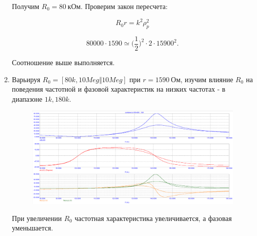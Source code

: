 \documentclass[a4paper, 12pt]{article}%
\begin{document}
\begin{enumerate}
Получим $R_0 = 80 \: \textit{кОм}$. Проверим закон пересчета:

\[R_0 r = k^2 \rho_p^2\]

\[80000 \cdot 1590 \simeq \Big(\frac{1}{2}\Big)^2 \cdot 2 \cdot 15900^2.\]

Соотношение выше выполняется.

\item Варьируя $R_0 = [80k, 10Meg \Vert 10Meg]$ при $r = 1590 \: \textit{Ом}$, изучим влияние $R_0$ на поведения частотной и фазовой характеристик на низких частотах - в диапазоне $1k, 180k$.

\begin{figure}[h!]
\centering
\includegraphics[scale=0.4]{combined_AC5.png}
\label{fig:Image1}
\end{figure}

При увеличении $R_0$ частотная характеристика увеличивается, а фазовая уменьшается.

\end{enumerate}
\end{document}

